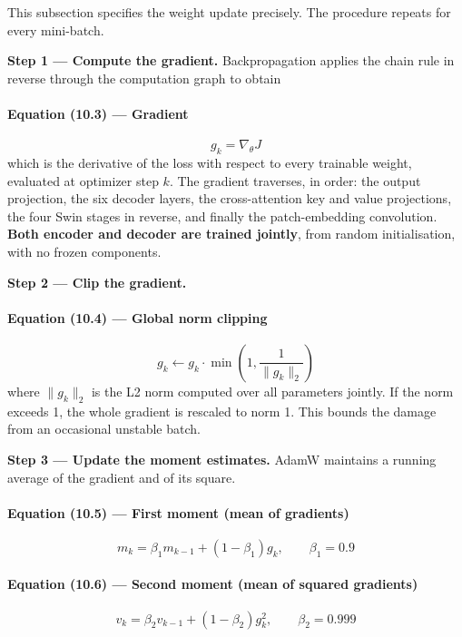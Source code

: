\documentclass[12pt]{article}
\begin{document}
This subsection specifies the weight update precisely. The procedure repeats for every mini-batch.

\textbf{Step 1 --- Compute the gradient.} Backpropagation applies the chain rule in reverse through the computation graph to obtain

\paragraph{Equation (10.3) --- Gradient}
\begin{equation}
g_k = \nabla_\theta J
\end{equation}
which is the derivative of the loss with respect to every trainable weight, evaluated at optimizer step $k$. The gradient traverses, in order: the output projection, the six decoder layers, the cross-attention key and value projections, the four Swin stages in reverse, and finally the patch-embedding convolution. \textbf{Both encoder and decoder are trained jointly}, from random initialisation, with no frozen components.

\textbf{Step 2 --- Clip the gradient.}

\paragraph{Equation (10.4) --- Global norm clipping}
\begin{equation}
g_k \leftarrow g_k \cdot \min\!\left(1, \frac{1}{\|g_k\|_2}\right)
\end{equation}
where $\|g_k\|_2$ is the L2 norm computed over all parameters jointly. If the norm exceeds 1, the whole gradient is rescaled to norm 1. This bounds the damage from an occasional unstable batch.

\textbf{Step 3 --- Update the moment estimates.} AdamW maintains a running average of the gradient and of its square.

\paragraph{Equation (10.5) --- First moment (mean of gradients)}
\begin{equation}
m_k = \beta_1 m_{k-1} + (1-\beta_1) g_k, \qquad \beta_1 = 0.9
\end{equation}

\paragraph{Equation (10.6) --- Second moment (mean of squared gradients)}
\begin{equation}
v_k = \beta_2 v_{k-1} + (1-\beta_2) g_k^2, \qquad \beta_2 = 0.999
\end{equation}
\end{document}
